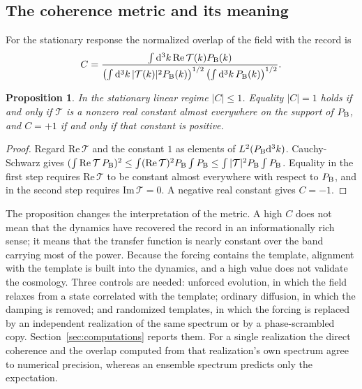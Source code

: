 \documentclass[11pt]{article}
\newtheorem{proposition}{Proposition}[section]
\theoremstyle{definition}
\theoremstyle{remark}
\newcommand{\dd}{\mathrm{d}}
\newcommand{\TT}{\mathcal{T}}
\begin{document}
\subsection{The coherence metric and its meaning}

For the stationary response the normalized overlap of the field with the record is
\begin{equation}
C=\frac{\int\dd^3k\,\mathrm{Re}\,\TT(k)P_{\rm B}(k)}{\left(\int\dd^3k\,|\TT(k)|^2P_{\rm B}(k)\right)^{1/2}\left(\int\dd^3k\,P_{\rm B}(k)\right)^{1/2}}.
\end{equation}

\begin{proposition}\label{prop:coh}
In the stationary linear regime $|C|\le1$. Equality $|C|=1$ holds if and only if $\TT$ is a nonzero real constant almost everywhere on the support of $P_{\rm B}$, and $C=+1$ if and only if that constant is positive.
\end{proposition}

\begin{proof}
Regard $\mathrm{Re}\,\TT$ and the constant $1$ as elements of $L^2(P_{\rm B}\dd^3k)$. Cauchy-Schwarz gives $(\int\mathrm{Re}\,\TT\,P_{\rm B})^2\le\int(\mathrm{Re}\,\TT)^2P_{\rm B}\int P_{\rm B}\le\int|\TT|^2P_{\rm B}\int P_{\rm B}$. Equality in the first step requires $\mathrm{Re}\,\TT$ to be constant almost everywhere with respect to $P_{\rm B}$, and in the second step requires $\mathrm{Im}\,\TT=0$. A negative real constant gives $C=-1$.
\end{proof}

The proposition changes the interpretation of the metric. A high $C$ does not mean that the dynamics have recovered the record in an informationally rich sense; it means that the transfer function is nearly constant over the band carrying most of the power. Because the forcing contains the template, alignment with the template is built into the dynamics, and a high value does not validate the cosmology. Three controls are needed: unforced evolution, in which the field relaxes from a state correlated with the template; ordinary diffusion, in which the damping is removed; and randomized templates, in which the forcing is replaced by an independent realization of the same spectrum or by a phase-scrambled copy. Section~\ref{sec:computations} reports them. For a single realization the direct coherence and the overlap computed from that realization's own spectrum agree to numerical precision, whereas an ensemble spectrum predicts only the expectation.
\end{document}

